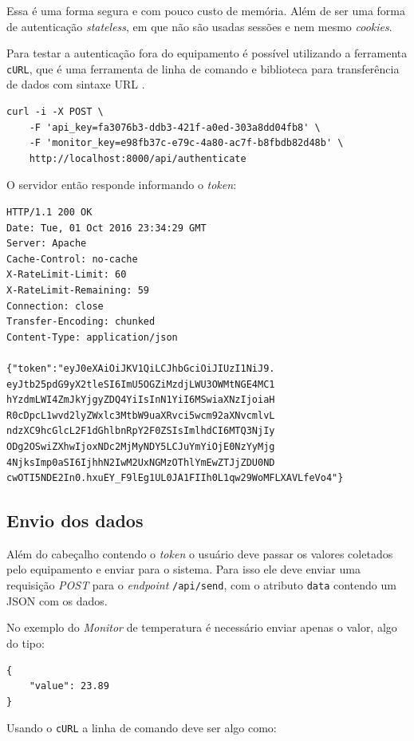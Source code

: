 Essa é uma forma segura e com pouco custo de memória. Além de ser uma
forma de autenticação \emph{stateless}, em que não são usadas sessões e
nem mesmo \emph{cookies}.

Para testar a autenticação fora do equipamento \iot é possível
utilizando a ferramenta \texttt{cURL}, que é uma ferramenta de linha de
comando e biblioteca para transferência de dados com sintaxe URL
\cite{curl:1996}.

\begin{verbatim}
curl -i -X POST \
    -F 'api_key=fa3076b3-ddb3-421f-a0ed-303a8dd04fb8' \
    -F 'monitor_key=e98fb37c-e79c-4a80-ac7f-b8fbdb82d48b' \
    http://localhost:8000/api/authenticate
\end{verbatim}

O servidor então responde informando o \emph{token}:

\begin{verbatim}
HTTP/1.1 200 OK
Date: Tue, 01 Oct 2016 23:34:29 GMT
Server: Apache
Cache-Control: no-cache
X-RateLimit-Limit: 60
X-RateLimit-Remaining: 59
Connection: close
Transfer-Encoding: chunked
Content-Type: application/json

{"token":"eyJ0eXAiOiJKV1QiLCJhbGciOiJIUzI1NiJ9.
eyJtb25pdG9yX2tleSI6ImU5OGZiMzdjLWU3OWMtNGE4MC1
hYzdmLWI4ZmJkYjgyZDQ4YiIsInN1YiI6MSwiaXNzIjoiaH
R0cDpcL1wvd2lyZWxlc3MtbW9uaXRvci5wcm92aXNvcmlvL
ndzXC9hcGlcL2F1dGhlbnRpY2F0ZSIsImlhdCI6MTQ3NjIy
ODg2OSwiZXhwIjoxNDc2MjMyNDY5LCJuYmYiOjE0NzYyMjg
4NjksImp0aSI6IjhhN2IwM2UxNGMzOThlYmEwZTJjZDU0ND
cwOTI5NDE2In0.hxuEY_F9lEg1UL0JA1FIIh0L1qw29WoMFLXAVLfeVo4"}
\end{verbatim}

\subsection{Envio dos dados}\label{envio-dos-dados}

Além do cabeçalho contendo o \emph{token} o usuário deve passar os
valores coletados pelo equipamento e enviar para o sistema. Para isso
ele deve enviar uma requisição \emph{POST} para o \emph{endpoint}
\texttt{/api/send}, com o atributo \texttt{data} contendo um JSON com os
dados.

No exemplo do \emph{Monitor} de temperatura é necessário enviar apenas o
valor, algo do tipo:

\begin{verbatim}
{
    "value": 23.89
}
\end{verbatim}

Usando o \texttt{cURL} a linha de comando deve ser algo como:

